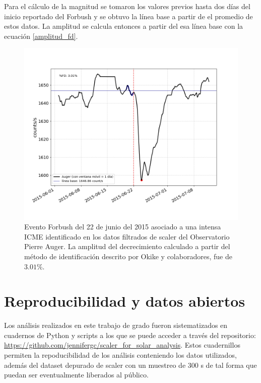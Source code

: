 Para el cálculo de la magnitud se tomaron los valores previos hasta dos días del inicio reportado del Forbush y se obtuvo la línea base a partir de el promedio de estos datos. La amplitud se calcula entonces a partir del esa línea base con  la ecuación \ref{amplitud_fd}.
\begin{figure}
\centering
\includegraphics[width=1\linewidth]{Figs/Figr/2015-06-22 00:00:00.png}
    \caption{Evento Forbush del 22 de junio del 2015 asociado a una intensa ICME identificado en los datos filtrados de scaler del Observatorio Pierre Auger. La amplitud del decrecimiento calculado a partir del método de identificación descrito por Okike y colaboradores, fue de $3.01\%$.}
    \label{22junio2015}
    \end{figure}

\section{Reproducibilidad y datos abiertos}

Los análisis realizados en este trabajo de grado fueron sistematizados en cuadernos de Python y scripts a los que se puede acceder a través del repositorio: \url{https://github.com/jennifergc/scaler_for_solar_analysis}. Estos cuadernillos permiten la repoducibilidad de los análisis conteniendo los datos utilizados, además del dataset depurado de scaler con un muestreo de 300 s de tal forma que puedan ser eventualmente liberados al público. 